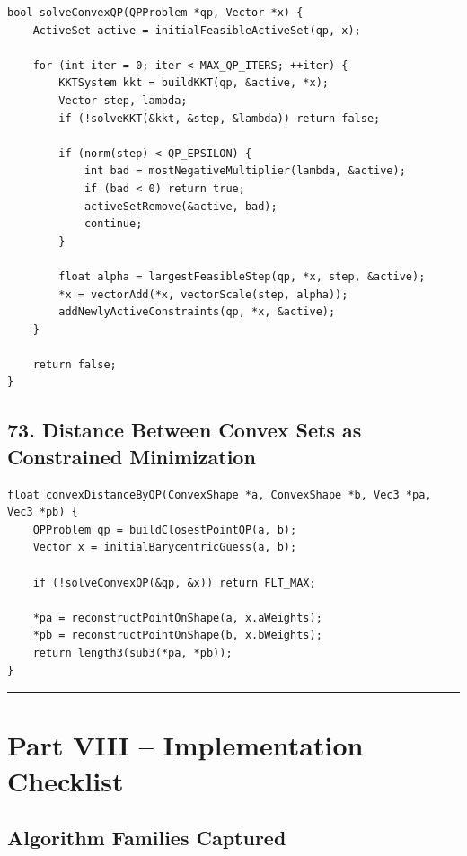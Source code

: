 \documentclass[10pt,letterpaper]{article}
\begin{document}
\begin{verbatim}
bool solveConvexQP(QPProblem *qp, Vector *x) {
    ActiveSet active = initialFeasibleActiveSet(qp, x);

    for (int iter = 0; iter < MAX_QP_ITERS; ++iter) {
        KKTSystem kkt = buildKKT(qp, &active, *x);
        Vector step, lambda;
        if (!solveKKT(&kkt, &step, &lambda)) return false;

        if (norm(step) < QP_EPSILON) {
            int bad = mostNegativeMultiplier(lambda, &active);
            if (bad < 0) return true;
            activeSetRemove(&active, bad);
            continue;
        }

        float alpha = largestFeasibleStep(qp, *x, step, &active);
        *x = vectorAdd(*x, vectorScale(step, alpha));
        addNewlyActiveConstraints(qp, *x, &active);
    }

    return false;
}
\end{verbatim}

\subsection*{73. Distance Between Convex Sets as Constrained Minimization}

\begin{verbatim}
float convexDistanceByQP(ConvexShape *a, ConvexShape *b, Vec3 *pa, Vec3 *pb) {
    QPProblem qp = buildClosestPointQP(a, b);
    Vector x = initialBarycentricGuess(a, b);

    if (!solveConvexQP(&qp, &x)) return FLT_MAX;

    *pa = reconstructPointOnShape(a, x.aWeights);
    *pb = reconstructPointOnShape(b, x.bWeights);
    return length3(sub3(*pa, *pb));
}
\end{verbatim}

\medskip\hrule\medskip

\clearpage
\section*{Part VIII -- Implementation Checklist}

\subsection*{Algorithm Families Captured}
\end{document}
